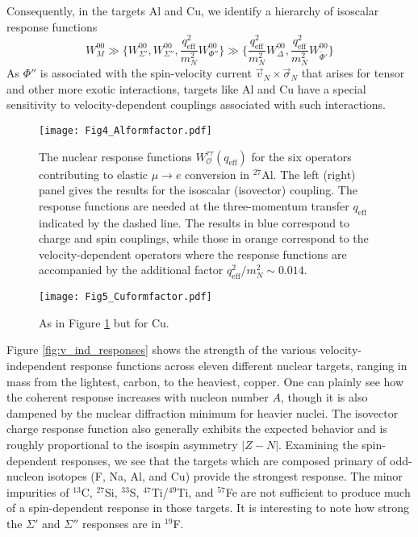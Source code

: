\documentclass{book}[letterpaper,12pt]
\begin{document}
Consequently, in the targets Al and Cu, we identify a hierarchy of isoscalar response functions
\begin{equation}
W_M^{00}\gg \bigg\{W^{00}_{\Sigma'},W_{\Sigma''}^{00},\frac{q_\mathrm{eff}^2}{m_N^2}W^{00}_{\Phi''}\bigg\}\gg\bigg\{\frac{q_\mathrm{eff}^2}{m_N^2}W^{00}_{\Delta},\frac{q^2_\mathrm{eff}}{m_N^2}W_{\tilde{\Phi}'}^{00}\bigg\}
\end{equation}
As $\Phi''$ is associated with the spin-velocity current $\vec{v}_N\times\vec{\sigma}_N$ that arises for tensor and other more exotic interactions, targets like Al and Cu have a special sensitivity to velocity-dependent couplings associated with such interactions. 
\begin{figure}
\centering
\texttt{[image: Fig4\_Alformfactor.pdf]}
\caption{The nuclear response functions $W^{\tau\tau}_\mathcal{O}(q_\mathrm{eff})$ for the six operators contributing to elastic $\mu\rightarrow e$ conversion in $^{27}$Al. The left (right) panel gives the results for the isoscalar (isovector) coupling. The response functions are needed at the three-momentum transfer $q_\mathrm{eff}$ indicated by the dashed line. The results in blue correspond to charge and spin couplings, while those in orange correspond to the velocity-dependent operators where the response functions are accompanied by the additional factor $q^2_\mathrm{eff}/m_N^2\sim 0.014$.}
\label{fig:Al_responses}
\end{figure}
\begin{figure}
\centering
\texttt{[image: Fig5\_Cuformfactor.pdf]}
\caption{As in Figure \ref{fig:Al_responses} but for Cu.}
\label{fig:Cu_responses}
\end{figure}

Figure \ref{fig:v_ind_responses} shows the strength of the various velocity-independent response functions across eleven different nuclear targets, ranging in mass from the lightest, carbon, to the heaviest, copper. One can plainly see how the coherent response increases with nucleon number $A$, though it is also dampened by the nuclear diffraction minimum for heavier nuclei. The isovector charge response function also generally exhibits the expected behavior and is roughly proportional to the isospin asymmetry $|Z-N|$. Examining the spin-dependent responses, we see that the targets which are composed primary of odd-nucleon isotopes (F, Na, Al, and Cu) provide the strongest response. The minor impurities of $^{13}$C, $^{27}$Si, $^{33}$S, $^{47}$Ti/$^{49}$Ti, and $^{57}$Fe are not sufficient to produce much of a spin-dependent response in those targets. It is interesting to note how strong the $\Sigma'$ and $\Sigma''$ responses are in $^{19}$F.
\end{document}
